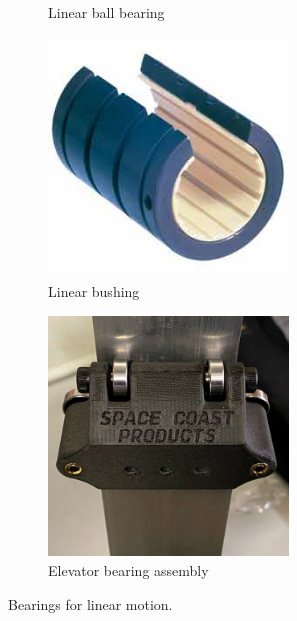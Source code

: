 \documentclass[10pt,letterpaper]{book}
\begin{document}
\begin{figure}[H]
\begin{subfigure}[b]{.32\linewidth}
			\caption{Linear ball bearing}
		\end{subfigure}
		\begin{subfigure}[b]{.32\linewidth}
			\includegraphics[width=0.7\textwidth]{imgs/linearbushing.jpeg}
			\caption{Linear bushing}
		\end{subfigure}
		\begin{subfigure}[b]{.32\linewidth}
			\includegraphics[width=0.7\textwidth]{imgs/elevatorbearingassy.jpeg}
			\caption{Elevator bearing assembly}
		\end{subfigure}
		
		\caption{Bearings for linear motion.}
	\end{figure}
	
\end{document}
